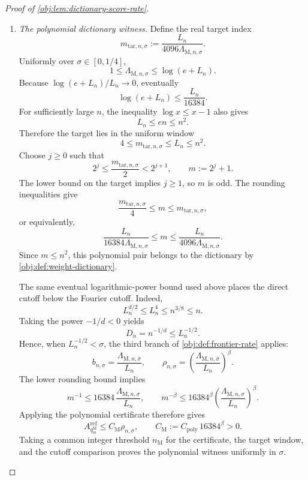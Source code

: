 \documentclass[11pt]{article}
\begin{document}
\begin{proof}[Proof of \cref{obj:lem:dictionary-score-rate}]
\begin{enumerate}
Finally, the standard logarithmic-power comparison gives
\[
\frac{L_n^4}{n^{3/8}}\longrightarrow0,
\qquad
L_n^4\le n^{3/8}
\quad\text{for all sufficiently large }n.
\]
The degree condition implies \(1\le m\le L_n\). Since
\(\kappa+\beta+1\le4\), it follows that
\[
m^{\kappa+\beta+1}\le m^4\le L_n^4\le n^{3/8},
\qquad
n^{-3/8}m^{\kappa+1}\le m^{-\beta}.
\]
Also,
\[
n^{-1/2}\le n^{-3/8}
\le n^{-3/8}m^{\kappa+1}\le m^{-\beta}.
\]
Substitution into the reference score proves
\[
A_{q_m^{\mathrm M}}^{\mathrm{ref}}
\le C_{\mathrm{poly}}m^{-\beta},
\qquad
C_{\mathrm{poly}}
:=C_{\mathrm M,bias}+4C_{\mathrm M,ratio}+2\sqrt3>0,
\]
uniformly for all sufficiently large \(n\), all public \(\sigma\), and all positive odd \(m\) satisfying the degree condition.

\item \emph{The polynomial dictionary witness.}
Define the real target index
\[
m_{\mathrm{tar},n,\sigma}
:=\frac{L_n}{4096\Lambda_{\mathrm M,n,\sigma}}.
\]
Uniformly over \(\sigma\in[0,1/4]\),
\[
1\le\Lambda_{\mathrm M,n,\sigma}\le\log(e+L_n).
\]
Because \(\log(e+L_n)/L_n\to0\), eventually
\[
\log(e+L_n)\le\frac{L_n}{16384}.
\]
For sufficiently large \(n\), the inequality \(\log x\le x-1\) also gives
\[
L_n\le en\le n^2.
\]
Therefore the target lies in the uniform window
\[
4\le m_{\mathrm{tar},n,\sigma}\le L_n\le n^2.
\]
Choose \(j\ge0\) such that
\[
2^j\le\frac{m_{\mathrm{tar},n,\sigma}}2<2^{j+1},
\qquad
m:=2^j+1.
\]
The lower bound on the target implies \(j\ge1\), so \(m\) is odd. The rounding inequalities give
\[
\frac{m_{\mathrm{tar},n,\sigma}}4\le m\le m_{\mathrm{tar},n,\sigma},
\]
or equivalently,
\[
\frac{L_n}{16384\Lambda_{\mathrm M,n,\sigma}}
\le m
\le\frac{L_n}{4096\Lambda_{\mathrm M,n,\sigma}}.
\]
Since \(m\le n^2\), this polynomial pair belongs to the dictionary by \cref{obj:def:weight-dictionary}.

The same eventual logarithmic-power bound used above places the direct cutoff below the Fourier cutoff. Indeed,
\[
L_n^{d/2}\le L_n^4\le n^{3/8}\le n.
\]
Taking the power \(-1/d<0\) yields
\[
D_n=n^{-1/d}\le L_n^{-1/2}.
\]
Hence, when \(L_n^{-1/2}<\sigma\), the third branch of \cref{obj:def:frontier-rate} applies:
\[
b_{n,\sigma}
=\frac{\Lambda_{\mathrm M,n,\sigma}}{L_n},
\qquad
\rho_{n,\sigma}
=\left(\frac{\Lambda_{\mathrm M,n,\sigma}}{L_n}\right)^\beta.
\]
The lower rounding bound implies
\[
m^{-1}\le16384\,\frac{\Lambda_{\mathrm M,n,\sigma}}{L_n},
\qquad
m^{-\beta}
\le16384^\beta
\left(\frac{\Lambda_{\mathrm M,n,\sigma}}{L_n}\right)^\beta.
\]
Applying the polynomial certificate therefore gives
\[
A_{q_m^{\mathrm M}}^{\mathrm{ref}}
\le C_{\mathrm M}\rho_{n,\sigma},
\qquad
C_{\mathrm M}:=C_{\mathrm{poly}}\,16384^\beta>0.
\]
Taking a common integer threshold \(n_{\mathrm M}\) for the certificate, the target window, and the cutoff comparison proves the polynomial witness uniformly in \(\sigma\).


\end{enumerate}
\end{proof}
\end{document}

